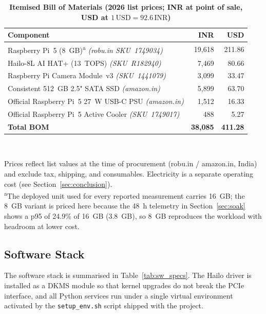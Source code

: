 \documentclass{ieeeaccess}
\begin{document}
\begin{table}[ht!]
\caption{\textbf{Itemised Bill of Materials (2026 list prices; INR at point of sale, USD at $1\,\text{USD}=92.6\,\text{INR}$)}}
\label{tab:bom}
\setlength{\tabcolsep}{3pt}
\centering\footnotesize
\begin{tabular}{|l|r|r|}
\hline
\textbf{Component} & \textbf{INR} & \textbf{USD} \\
\hline
Raspberry Pi~5 (8~GB)\textsuperscript{a} \emph{(robu.in SKU~1749034)}          & 19{,}618 & 211.86 \\
Hailo-8L AI HAT+ (13~TOPS)  \emph{(SKU~R182940)}                                &  7{,}469 &  80.66 \\
Raspberry Pi Camera Module~v3 \emph{(SKU~1441079)}                              &  3{,}099 &  33.47 \\
Consistent 512~GB 2.5" SATA SSD \emph{(amazon.in)}                               &  5{,}899 &  63.70 \\
Official Raspberry Pi~5 27~W USB-C PSU \emph{(amazon.in)}                       &  1{,}512 &  16.33 \\
Official Raspberry Pi~5 Active Cooler \emph{(SKU~1749017)}                      &     488 &   5.27 \\
\hline
\textbf{Total BOM}                                                              & \textbf{38{,}085} & \textbf{411.28} \\
\hline
\end{tabular}\\[2pt]
\raggedright\scriptsize Prices reflect list values at the time of procurement (robu.in / amazon.in, India) and exclude tax, shipping, and consumables. Electricity is a separate operating cost (see Section~\ref{sec:conclusion}).\\
\textsuperscript{a}The deployed unit used for every reported measurement carries 16~GB; the 8~GB variant is priced here because the 48~h telemetry in Section~\ref{sec:soak} shows a p95 of 24.9\% of 16~GB (3.8~GB), so 8~GB reproduces the workload with headroom at lower cost.
\end{table}

\subsection{Software Stack}
The software stack is summarised in Table~\ref{tab:sw_specs}. The Hailo driver is installed as a DKMS module so that kernel upgrades do not break the PCIe interface, and all Python services run under a single virtual environment activated by the \texttt{setup\_env.sh} script shipped with the project.
\end{document}

